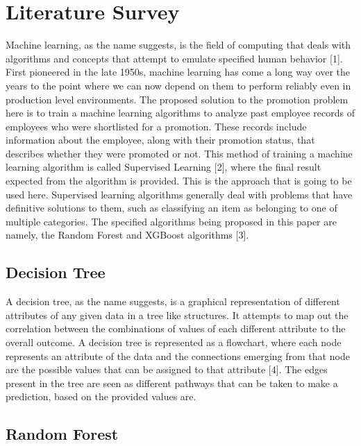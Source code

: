 \documentclass[
]{article}
\begin{document}
\hypertarget{literature-survey}{%
\section{Literature Survey}\label{literature-survey}}

Machine learning, as the name suggests, is the field of computing that
deals with algorithms and concepts that attempt to emulate specified
human behavior {[}1{]}. First pioneered in the late 1950s, machine
learning has come a long way over the years to the point where we can
now depend on them to perform reliably even in production level
environments. The proposed solution to the promotion problem here is to
train a machine learning algorithms to analyze past employee records of
employees who were shortlisted for a promotion. These records include
information about the employee, along with their promotion status, that
describes whether they were promoted or not. This method of training a
machine learning algorithm is called Supervised Learning {[}2{]}, where
the final result expected from the algorithm is provided. This is the
approach that is going to be used here. Supervised learning algorithms
generally deal with problems that have definitive solutions to them,
such as classifying an item as belonging to one of multiple categories.
The specified algorithms being proposed in this paper are namely, the
Random Forest and XGBoost algorithms {[}3{]}.

\hypertarget{decision-tree}{%
\subsection{Decision Tree}\label{decision-tree}}

A decision tree, as the name suggests, is a graphical representation of
different attributes of any given data in a tree like structures. It
attempts to map out the correlation between the combinations of values
of each different attribute to the overall outcome. A decision tree is
represented as a flowchart, where each node represents an attribute of
the data and the connections emerging from that node are the possible
values that can be assigned to that attribute {[}4{]}. The edges present
in the tree are seen as different pathways that can be taken to make a
prediction, based on the provided values are.

\hypertarget{random-forest}{%
\subsection{Random Forest}\label{random-forest}}
\end{document}
